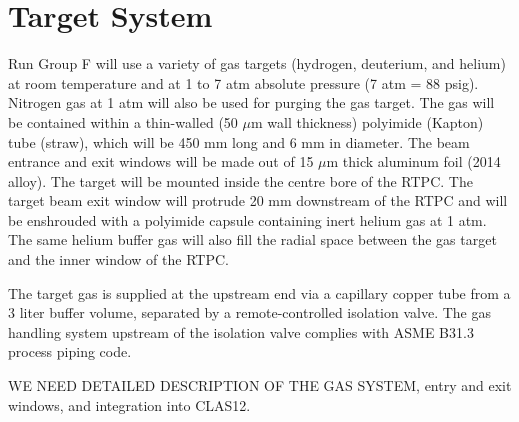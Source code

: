 \section{Target System}

Run Group F will use a variety of gas targets (hydrogen, deuterium, and helium) at room temperature and
at 1 to 7 atm absolute pressure (7 atm = 88 psig). Nitrogen gas at 1 atm will also be used for purging the gas target.
The gas will be contained within a thin-walled (50 $\mu$m wall thickness) polyimide (Kapton) tube (straw), which will be 
450 mm long and 6 mm in diameter. 
The beam entrance and exit windows will be made out of 15 $\mu$m thick aluminum foil (2014 alloy).
The target will be mounted inside the centre bore of the RTPC. The target beam exit window will protrude 
20 mm downstream of the RTPC and will be enshrouded with a polyimide capsule containing inert helium gas at 1 atm.
The same helium buffer gas will also fill the radial space between the gas target and the inner window of the RTPC.

The target gas is supplied at the upstream end via a capillary copper tube from a 3 liter buffer volume, 
separated by a remote-controlled isolation valve. The gas handling system upstream of the isolation valve 
complies with ASME B31.3 process piping code.


WE NEED DETAILED DESCRIPTION OF THE GAS SYSTEM, entry and exit windows, and integration
into CLAS12.

%   
               
